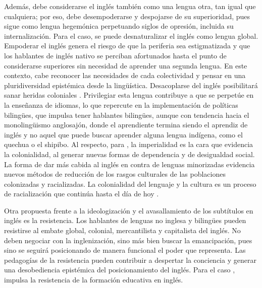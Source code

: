 \documentclass[spanish]{textolivre}
\begin{document}
Además, debe considerarse el inglés también como una lengua otra, tan igual que cualquiera; por eso, debe desempoderarse y despojarse de su superioridad, pues sigue como lengua hegemónica perpetuando siglos de opresión, incluida su internalización. Para el caso, se puede desnaturalizar el inglés como lengua global. Empoderar el inglés genera el riesgo de que la periferia sea estigmatizada y que los hablantes de inglés nativo se perciban afortunados hasta el punto de considerarse superiores sin necesidad de aprender una segunda lengua. En este contexto, cabe reconocer las necesidades de cada colectividad y pensar en una pluridiversidad epistémica \cite{dussel_nueva_2009} desde la lingüística. Desacoplarse del inglés posibilitará sanar heridas coloniales \cite[p.6]{baum2019decir}. Privilegiar esta lengua contribuye a que se perpetúe en la enseñanza de idiomas, lo que repercute en la implementación de políticas bilingües, que impulsa tener hablantes bilingües, aunque con tendencia hacia el monolingüismo anglosajón, donde el aprendiente termina siendo el aprendiz de inglés y no aquel que puede buscar aprender alguna lengua indígena, como el quechua o el shipibo. Al respecto, para \textcite{maniglio_alisis_2021}, la imperialidad es la cara que evidencia la colonialidad, al generar nuevas formas de dependencia y de desigualdad social. La forma de dar más cabida al inglés en contra de lenguas minorizadas evidencia nuevos métodos de reducción de los rasgos culturales de las poblaciones colonizadas y racializadas. La colonialidad del lenguaje y la cultura es un proceso de racialización que continúa hasta el día de hoy \cite{veronelli_sobre_2015}. 

Otra propuesta frente a la ideologización y el avasallamiento de los subtítulos en inglés es la resistencia. Los hablantes de lenguas no inglesa y bilingües pueden resistirse al embate global, colonial, mercantilista y capitalista del inglés. No deben negociar con la inglenización, sino más bien buscar la emancipación, pues sino se seguirá posicionando de manera funcional el poder que representa. Las pedagogías de la resistencia pueden contribuir a despertar la conciencia y generar una desobediencia epistémica del posicionamiento del inglés. Para el caso \textcite{baum2019decir}, impulsa la resistencia de la formación educativa en inglés. 
\end{document}
